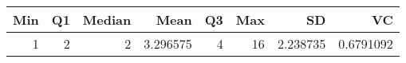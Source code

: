 
\begin{tabular}[t]{rrrrrrrr}
\toprule
Min & Q1 & Median & Mean & Q3 & Max & SD & VC\\
\midrule
1 & 2 & 2 & 3.296575 & 4 & 16 & 2.238735 & 0.6791092\\
\bottomrule
\end{tabular}